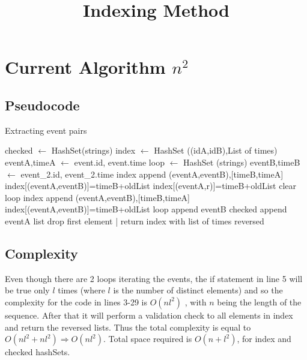 \documentclass{article}
\title{Indexing Method}
\begin{document}
\graphicspath{{../graphs/}}
\maketitle
\section{Current Algorithm $n^2$}
\subsection{Pseudocode}
\begin{algorithm}
	\caption{Extracting event pairs}
	\label{alg:n_square}
	\begin{algorithmic}[5]
		\State checked $\leftarrow$ HashSet(strings)
		\State index $\leftarrow$ HashSet ((idA,idB),List of times)
		 
		\State eventA,timeA $\leftarrow$ event.id, event.time
		\State loop $\leftarrow$ HashSet (strings)	
		 
		\State eventB,timeB $\leftarrow$ event\_2.id, event\_2.time
		\State index append (eventA,eventB),[timeB,timeA]
		\Else
		\State index[(eventA,eventB)]=timeB+oldList
		\EndIf
		\State index[(eventA,r)]=timeB+oldList
		\EndFor
		\State clear loop
		\State index append (eventA,eventB),[timeB,timeA]
		\Else
		\State index[(eventA,eventB)]=timeB+oldList
		\EndIf
		\State loop append eventB
		\EndIf
		\EndFor
		\State checked append eventA			
		\EndIf
		\EndFor
		 
		\State list drop first element
		|\EndIf
		\EndFor
		\State return index with list of times reversed
	\end{algorithmic}
\end{algorithm}
\subsection{Complexity}
Even though there are 2 loops iterating the events, the if statement in line 5 will be true only $l$ times (where $l$ is the number of distinct elements) and so the complexity for the code in lines 3-29 is $O(nl^2)$ , with $n$ being the length of the sequence. After that it will perform a validation check to all elements in index and return the reversed lists. Thus the total complexity is equal to $O(nl^2 + nl^2) \Rightarrow O(nl^2)$. Total space required is $O(n+l^2)$, for index and checked hashSets.
\end{document}
